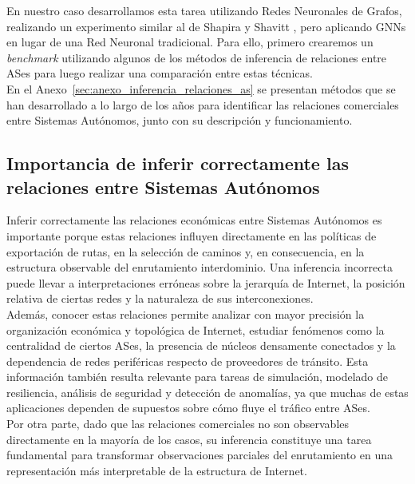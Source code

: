 En nuestro caso desarrollamos esta tarea utilizando Redes Neuronales de Grafos, realizando un experimento similar al de Shapira y Shavitt \cite{UnveilingtheTypeRelationshipBetweenAutonomousSystemsUsingDeepLearning}, pero aplicando GNNs en lugar de una Red Neuronal tradicional. Para ello, primero crearemos un \textit{benchmark} utilizando algunos de los métodos de inferencia de relaciones entre ASes para luego realizar una comparación entre estas técnicas.\\

En el Anexo~\ref{sec:anexo_inferencia_relaciones_as} se presentan métodos que se han desarrollado a lo largo de los años para identificar las relaciones comerciales entre Sistemas Autónomos, junto con su descripción y funcionamiento.\\



\subsection{Importancia de inferir correctamente las relaciones entre Sistemas Autónomos}

Inferir correctamente las relaciones económicas entre Sistemas Autónomos es importante porque estas relaciones influyen directamente en las políticas de exportación de rutas, en la selección de caminos y, en consecuencia, en la estructura observable del enrutamiento interdominio. Una inferencia incorrecta puede llevar a interpretaciones erróneas sobre la jerarquía de Internet, la posición relativa de ciertas redes y la naturaleza de sus interconexiones.\\
Además, conocer estas relaciones permite analizar con mayor precisión la organización económica y topológica de Internet, estudiar fenómenos como la centralidad de ciertos ASes, la presencia de núcleos densamente conectados y la dependencia de redes periféricas respecto de proveedores de tránsito. Esta información también resulta relevante para tareas de simulación, modelado de resiliencia, análisis de seguridad y detección de anomalías, ya que muchas de estas aplicaciones dependen de supuestos sobre cómo fluye el tráfico entre ASes.\\

Por otra parte, dado que las relaciones comerciales no son observables directamente en la mayoría de los casos, su inferencia constituye una tarea fundamental para transformar observaciones parciales del enrutamiento en una representación más interpretable de la estructura de Internet.\\


